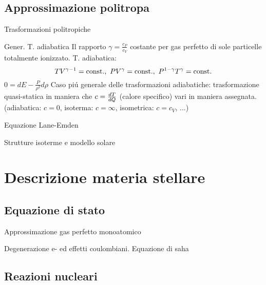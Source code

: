 \subsection{Approssimazione politropa}

\begin{frame}{Trasformazioni politropiche}
\begin{block}{Gener. T. adiabatica}
	Il rapporto $\gamma=\frac{c_P}{c_V}$ costante per gas perfetto di sole particelle totalmente ionizzato.
	T. adiabatica:
	\[TV\expy{\gamma-1}=\const,\ PV\expy{\gamma}=\const,\ P\expy{1-\gamma}T\expy{\gamma}=\const\]
$0=dE-\frac{P}{\rho^2}d\rho$
Caso pi\'u generale delle trasformazioni adiabatiche:  trasformazione quasi-statica in maniera che $c=\TDy{Q}{T}$ (calore specifico) vari in maniera assegnata. (adiabatica: $c=0$, isoterma: $c=\infty$, isometrica: $c=c_V$, ...)
\end{block}

\end{frame}

\begin{frame}{Equazione Lane-Emden}

\end{frame}

\begin{frame}{Strutture isoterme e modello solare}

\end{frame}


\section{Descrizione materia stellare}

\subsection{Equazione di stato}

\begin{frame}{Approssimazione gas perfetto monoatomico}

\end{frame}

\begin{frame}{Degenerazione e- ed effetti coulombiani. Equazione di saha}

\end{frame}

\subsection{Reazioni nucleari}

